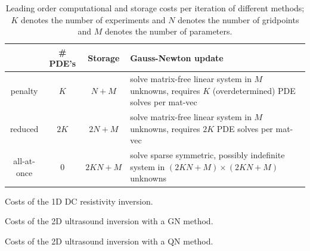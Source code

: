 \documentclass{iopart}
\begin{document}
\begin{table}
\begin{tabular}{c|c|c|p{5cm}}
         & \# PDE's & Storage & Gauss-Newton update \\
\hline
penalty  &  $K$  &    $N + M$     & solve matrix-free linear system in $M$ unknowns, requires $K$ (overdetermined) PDE solves per mat-vec \\
\hline
reduced  &  $2K $  &    $2N + M$     & solve matrix-free linear system in $M$ unknowns, requires $2K$ PDE solves per mat-vec                   \\
\hline
all-at-once&   0   &    $2KN + M$   &  solve sparse symmetric, possibly indefinite system in $(2KN + M) \times (2KN + M)$ unknowns \\ 
\end{tabular}
\caption{Leading order computational and storage costs per iteration of different methods; $K$ denotes the number of experiments and $N$ denotes the number of gridpoints and $M$ denotes the number of parameters.}
\label{table:costs}
\end{table}

\begin{table}
\centering

\caption{Costs of the 1D DC resistivity inversion.}
\label{table:1D_exp1}
\end{table}

\begin{table}
\centering

\caption{Costs of the 2D ultrasound inversion with a GN method.}
\label{table:2D_exp1}
\end{table}

\begin{table}
\centering

\caption{Costs of the 2D ultrasound inversion with a QN method.}
\label{table:2D_exp2}
\end{table}
\clearpage
\end{document}
